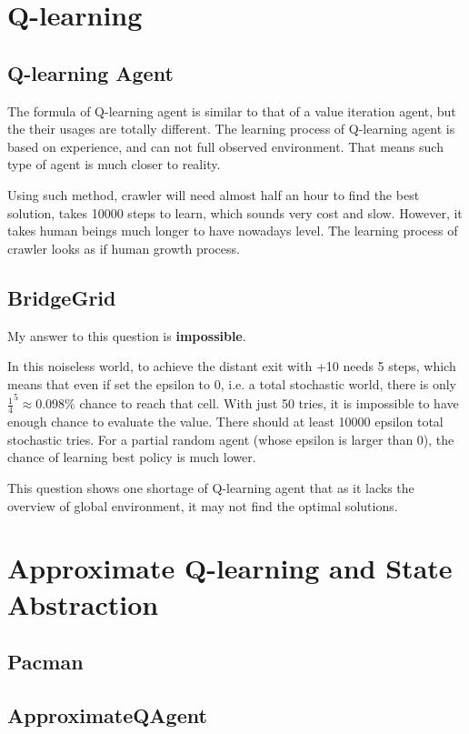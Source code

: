 \documentclass[12pt,a4paper]{article}
\begin{document}
	\section{Q-learning}
	\subsection{Q-learning Agent}
	The formula of Q-learning agent is similar to that of a value iteration agent, but the their usages are totally different. The learning process of Q-learning agent is based on experience, and can not full observed environment. That means such type of agent is much closer to reality.\par
	Using such method, crawler will need almost half an hour to find the best solution, takes 10000 steps to learn, which sounds very cost and slow. However, it takes human beings much longer to have nowadays level. The learning process of crawler looks as if human growth process.
	\subsection{BridgeGrid}
	My answer to this question is \textbf{impossible}.\par
	In this noiseless world, to achieve the distant exit with +10 needs 5 steps, which means that even if set the epsilon to 0, i.e. a total stochastic world, there is only $ \frac{1}{4}^5 \approx 0.098\% $ chance to reach that cell. With just 50 tries, it is impossible to have enough chance to evaluate the value. There should at least 10000 epsilon total stochastic tries. For a partial random agent (whose epsilon is larger than 0), the chance of learning best policy is much lower.\par
	This question shows one shortage of Q-learning agent that as it lacks the overview of global environment, it may not find the optimal solutions.
	\section{Approximate Q-learning and State Abstraction}
	\subsection{Pacman}
	\subsection{ApproximateQAgent}
	
\end{document}
